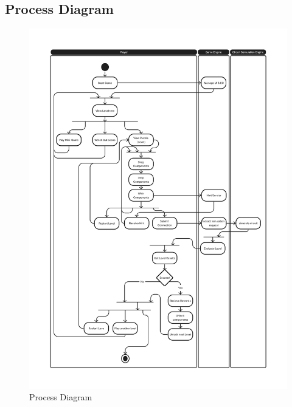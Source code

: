 \documentclass[../main.tex]{subfiles}
\begin{document}
\subsection{Process Diagram}
\begin{figure}[ht!]
\centering
\includegraphics[scale=0.27]{images/chapter3/Process.png}
\caption{Process Diagram}
\label{prcess.png}
\end{figure}
\vfill
\newpage
\vfill
\end{document}
